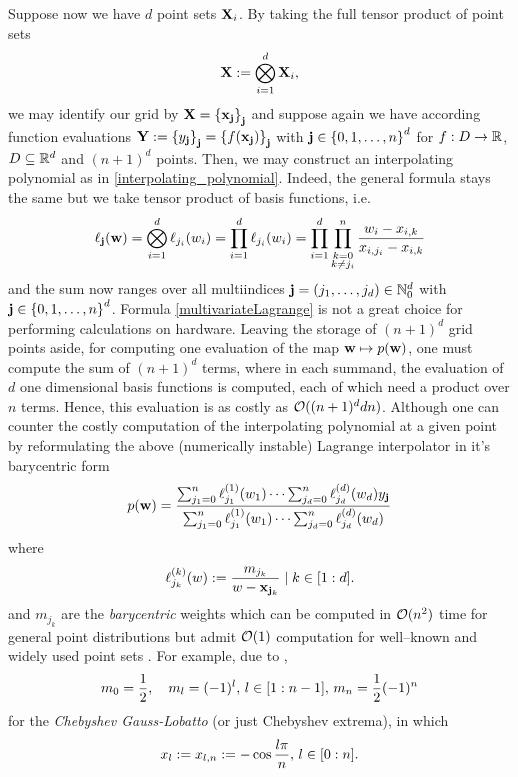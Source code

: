 \documentclass[12pt, oneside]{amsart}
\theoremstyle{definition}
\theoremstyle{remark}
\numberwithin{equation}{section}
\begin{document}
Suppose now we have \(d\) point sets \(\XX_i\). By taking the full tensor product of point sets \[
    \XX \defn \bigotimes_{i=1}^d \XX_i,
\] we may identify our grid by \(\XX = \set{\bfx_\bfj}_{\bfj}\) and suppose again we have according function evaluations \(\YY \defn \set{y_\bfj}_\bfj = \set{f(\bfx_\bfj)}_\bfj\) with \(\bfj \in \set{0,1,\dots,n}^d\) for \(f: D \to \R\), \(D \subseteq \R^d\) and \((n+1)^d\) points. Then, we may construct an interpolating polynomial as in \cref{interpolating_polynomial}. Indeed, the general formula stays the same but we take tensor product of basis functions, i.e. \begin{equation}\label{multivariateLagrange}
    \ell_\bfj(\bfw) = \bigotimes_{i=1}^d \ell_{j_i}(w_i) = \prod_{i=1}^d \ell_{j_i}(w_i) = \prod_{i=1}^d \prod_{\substack{k=0 \\ k \neq j_i}}^n \frac{w_i - x_{i, k}}{x_{i, j_i} - x_{i, k}}
\end{equation}
and the sum now ranges over all multiindices \(\bfj = (j_1, \dots, j_d) \in \N_0^d\) with \(\bfj \in \set{0, 1, \dots, n}^d\). Formula \ref{multivariateLagrange} is not a great choice for performing calculations on hardware. Leaving the storage of \((n+1)^d\) grid points aside, for computing one evaluation of the map \(\bfw \mapsto p(\bfw)\), one must compute the sum of \((n+1)^d\) terms, where in each summand, the evaluation of \(d\) one dimensional basis functions is computed, each of which need a product over \(n\) terms. Hence, this evaluation is as costly as \(\cO((n+1)^d d n)\). Although one can counter the costly computation of the interpolating polynomial at a given point by reformulating the above (numerically instable) Lagrange interpolator in it's barycentric form
\begin{equation}\label{eq:multivarBarycentric}
    p(\bfw) = \frac{\sum_{j_1=0}^{n} \ell^{(1)}_{j_1}(w_1) \cdots \sum_{j_d=0}^{n} \ell^{(d)}_{j_d}(w_d) y_\bfj}{\sum_{j_1=0}^{n} \ell^{(1)}_{j_1}(w_1) \cdots \sum_{j_d=0}^{n} \ell^{(d)}_{j_d}(w_d)}
\end{equation}
where
\begin{equation}\label{eq:barycentricBasis}
    \ell^{(k)}_{j_k}(w) \defn \frac{m_{j_k}}{w-\bfx_{\bfj_k}} \mid k \in \indexset[1]{d}.
\end{equation}
and \(m_{j_k}\) are the \emph{barycentric} weights which can be computed in \(\cO(n^2)\) time for general point distributions but admit \(\cO(1)\) computation for well--known and widely used point sets \cite{klimke2004}. For example, due to \cite{Berut_2004},
\begin{equation}\label{barycentric_weights_chebyshev}
    m_{0} = \frac{1}{2},\quad m_{l} = (-1)^l,\, l \in \indexset[1]{n-1},\, m_n = \frac{1}{2}(-1)^n
\end{equation}
for the \emph{Chebyshev Gauss-Lobatto} (or just Chebyshev extrema), in which \[
    x_l \defn x_{l,n} \defn - \cos\frac{l \pi}{n},\, l \in \indexset[0]{n}.
\]
\end{document}
